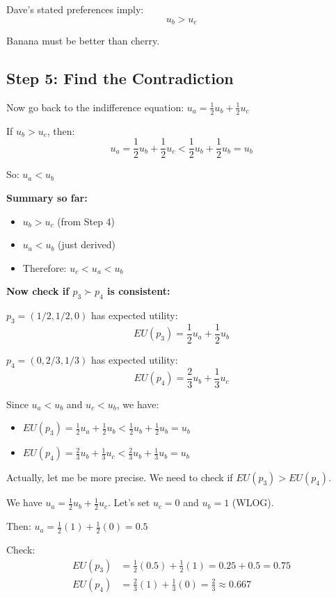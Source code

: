 \documentclass[11pt]{article}
\begin{document}
\begin{tcolorbox}[colback=red!10!white,colframe=red!75!black,title=Result from Preferences]
Dave's stated preferences imply: $$u_b > u_c$$

Banana must be better than cherry.
\end{tcolorbox}

\subsection{Step 5: Find the Contradiction}

Now go back to the indifference equation: $u_a = \frac{1}{2}u_b + \frac{1}{2}u_c$

If $u_b > u_c$, then:
\begin{equation}
u_a = \frac{1}{2}u_b + \frac{1}{2}u_c < \frac{1}{2}u_b + \frac{1}{2}u_b = u_b
\end{equation}

So: $u_a < u_b$

\textbf{Summary so far:}
\begin{itemize}
\item $u_b > u_c$ (from Step 4)
\item $u_a < u_b$ (just derived)
\item Therefore: $u_c < u_a < u_b$
\end{itemize}

\textbf{Now check if $p_3 \succ p_4$ is consistent:}

$p_3 = (1/2, 1/2, 0)$ has expected utility:
$$EU(p_3) = \frac{1}{2}u_a + \frac{1}{2}u_b$$

$p_4 = (0, 2/3, 1/3)$ has expected utility:
$$EU(p_4) = \frac{2}{3}u_b + \frac{1}{3}u_c$$

Since $u_a < u_b$ and $u_c < u_b$, we have:
\begin{itemize}
\item $EU(p_3) = \frac{1}{2}u_a + \frac{1}{2}u_b < \frac{1}{2}u_b + \frac{1}{2}u_b = u_b$
\item $EU(p_4) = \frac{2}{3}u_b + \frac{1}{3}u_c < \frac{2}{3}u_b + \frac{1}{3}u_b = u_b$
\end{itemize}

Actually, let me be more precise. We need to check if $EU(p_3) > EU(p_4)$.

We have $u_a = \frac{1}{2}u_b + \frac{1}{2}u_c$. Let's set $u_c = 0$ and $u_b = 1$ (WLOG).

Then: $u_a = \frac{1}{2}(1) + \frac{1}{2}(0) = 0.5$

Check:
\begin{align}
EU(p_3) &= \frac{1}{2}(0.5) + \frac{1}{2}(1) = 0.25 + 0.5 = 0.75 \\
EU(p_4) &= \frac{2}{3}(1) + \frac{1}{3}(0) = \frac{2}{3} \approx 0.667
\end{align}
\end{document}
